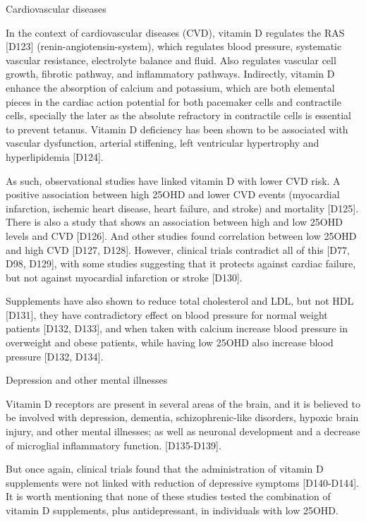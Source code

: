  

Cardiovascular diseases 

 

In the context of cardiovascular diseases (CVD), vitamin D regulates the RAS [D123] (renin-angiotensin-system), which regulates blood pressure, systematic vascular resistance, electrolyte balance and fluid. Also regulates vascular cell growth, fibrotic pathway, and inflammatory pathways. Indirectly, vitamin D enhance the absorption of calcium and potassium, which are both elemental pieces in the cardiac action potential for both pacemaker cells and contractile cells, specially the later as the absolute refractory in contractile cells is essential to prevent tetanus. Vitamin D deficiency has been shown to be associated with vascular dysfunction, arterial stiffening, left ventricular hypertrophy and hyperlipidemia [D124]. 

 

As such, observational studies have linked vitamin D with lower CVD risk. A positive association between high 25OHD and lower CVD events (myocardial infarction, ischemic heart disease, heart failure, and stroke) and mortality [D125]. There is also a study that shows an association between high and low 25OHD levels and CVD [D126]. And other studies found correlation between low 25OHD and high CVD [D127, D128].  However, clinical trials contradict all of this [D77, D98, D129], with some studies suggesting that it protects against cardiac failure, but not against myocardial infarction or stroke [D130]. 

 

Supplements have also shown to reduce total cholesterol and LDL, but not HDL [D131], they have contradictory effect on blood pressure for normal weight patients [D132, D133], and when taken with calcium increase blood pressure in overweight and obese patients, while having low 25OHD also increase blood pressure [D132, D134]. 

 

Depression and other mental illnesses 

 

Vitamin D receptors are present in several areas of the brain, and it is believed to be involved with depression, dementia, schizophrenic-like disorders, hypoxic brain injury, and other mental illnesses; as well as neuronal development and a decrease of microglial inflammatory function. [D135-D139]. 

 

But once again, clinical trials found that the administration of vitamin D supplements were not linked with reduction of depressive symptoms [D140-D144]. It is worth mentioning that none of these studies tested the combination of vitamin D supplements, plus antidepressant, in individuals with low 25OHD. 

